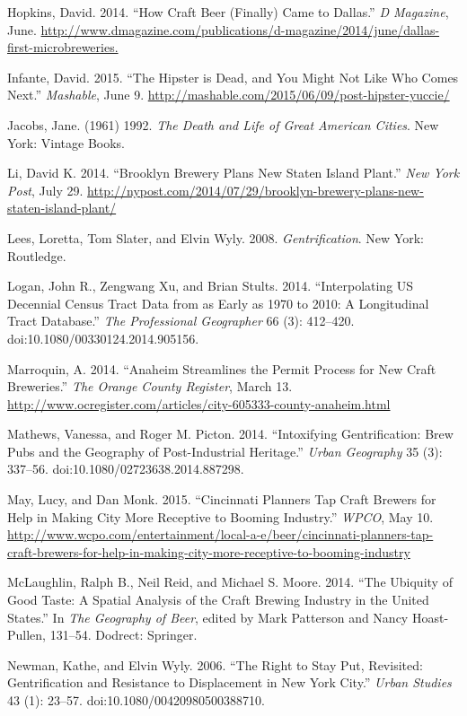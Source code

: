 \documentclass[]{article}
\begin{document}
Hopkins, David. 2014. ``How Craft Beer (Finally) Came to Dallas.''
\emph{D Magazine}, June.
\url{http://www.dmagazine.com/publications/d-magazine/2014/june/dallas-first-microbreweries.}

Infante, David. 2015. ``The Hipster is Dead, and You Might Not Like Who
Comes Next.'' \emph{Mashable}, June 9.
\url{http://mashable.com/2015/06/09/post-hipster-yuccie/}

Jacobs, Jane. (1961) 1992. \emph{The Death and Life of Great American
Cities}. New York: Vintage Books.

Li, David K. 2014. ``Brooklyn Brewery Plans New Staten Island Plant.''
\emph{New York Post}, July 29.
\url{http://nypost.com/2014/07/29/brooklyn-brewery-plans-new-staten-island-plant/}

Lees, Loretta, Tom Slater, and Elvin Wyly. 2008. \emph{Gentrification}.
New York: Routledge.

Logan, John R., Zengwang Xu, and Brian Stults. 2014. ``Interpolating US
Decennial Census Tract Data from as Early as 1970 to 2010: A
Longitudinal Tract Database.'' \emph{The Professional Geographer} 66
(3): 412--420. doi:10.1080/00330124.2014.905156.

Marroquin, A. 2014. ``Anaheim Streamlines the Permit Process for New
Craft Breweries.'' \emph{The Orange County Register}, March 13.
\url{http://www.ocregister.com/articles/city-605333-county-anaheim.html}

Mathews, Vanessa, and Roger M. Picton. 2014. ``Intoxifying
Gentrification: Brew Pubs and the Geography of Post-Industrial
Heritage.'' \emph{Urban Geography} 35 (3): 337--56.
doi:10.1080/02723638.2014.887298.

May, Lucy, and Dan Monk. 2015. ``Cincinnati Planners Tap Craft Brewers for Help in Making City More Receptive to Booming Industry.'' \emph{WPCO}, May 10. \url{http://www.wcpo.com/entertainment/local-a-e/beer/cincinnati-planners-tap-craft-brewers-for-help-in-making-city-more-receptive-to-booming-industry}

McLaughlin, Ralph B., Neil Reid, and Michael S. Moore. 2014. ``The
Ubiquity of Good Taste: A Spatial Analysis of the Craft Brewing Industry
in the United States.'' In \emph{The Geography of Beer}, edited by Mark
Patterson and Nancy Hoast-Pullen, 131--54. Dodrect: Springer.

Newman, Kathe, and Elvin Wyly. 2006. ``The Right to Stay Put, Revisited:
Gentrification and Resistance to Displacement in New York City.''
\emph{Urban Studies} 43 (1): 23--57. doi:10.1080/00420980500388710.
\end{document}
